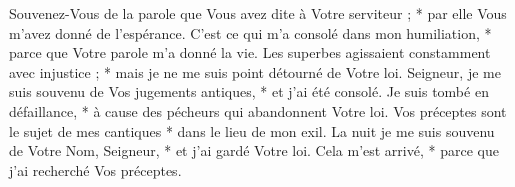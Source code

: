 Souvenez-Vous de la parole que Vous avez dite à Votre serviteur ; * par elle Vous m'avez donné de l'espérance.
\versseparator
C'est ce qui m'a consolé dans mon humiliation, * parce que Votre parole m'a donné la vie.
\versseparator
Les superbes agissaient constamment avec injustice ; * mais je ne me suis point détourné de Votre loi.
\versseparator
Seigneur, je me suis souvenu de Vos jugements antiques, * et j'ai été consolé.
\versseparator
Je suis tombé en défaillance, * à cause des pécheurs qui abandonnent Votre loi.
\versseparator
Vos préceptes sont le sujet de mes cantiques * dans le lieu de mon exil.
\versseparator
La nuit je me suis souvenu de Votre Nom, Seigneur, * et j'ai gardé Votre loi.
\versseparator
Cela m'est arrivé, * parce que j'ai recherché Vos préceptes.